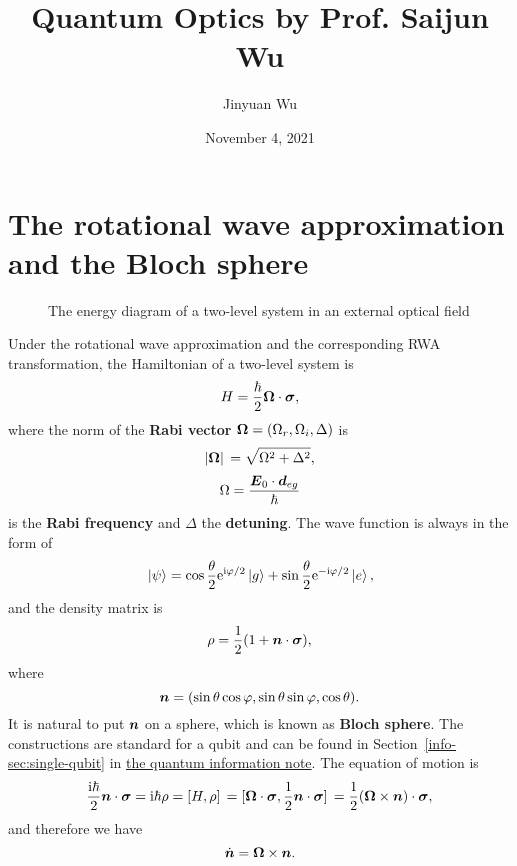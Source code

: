 \documentclass[hyperref, a4paper]{article}
\title{Quantum Optics by Prof. Saijun Wu}
\author{Jinyuan Wu}
\date{November 4, 2021}
\newcommand*{\ii}{\mathrm{i}}
\newcommand*{\ee}{\mathrm{e}}
\newcommand*{\concept}[1]{{\textbf{#1}}}
\newcommand{\infodoc}{\href{../information/quantum-circuit}{the quantum information note}}
\begin{document}
\maketitle

\section{The rotational wave approximation and the Bloch sphere}

\begin{figure}
    \centering
    
    \caption{The energy diagram of a two-level system in an external optical field}
\end{figure}

Under the rotational wave approximation and the corresponding RWA transformation, the Hamiltonian of a two-level system is 
\begin{equation}
    H = \frac{\hbar}{2} \vb*{\Omega} \cdot \vb*{\sigma},
    \label{eq:rwa-hamiltonian}
\end{equation}
where the norm of the \concept{Rabi vector} $\vb*{\Omega} = (\Omega_r, \Omega_i , \Delta)$ is
\begin{equation}
    \abs*{\vb*{\Omega}} = \sqrt{\Omega^2 + \Delta^2},
\end{equation}
\begin{equation}
    \Omega = \frac{\vb*{E}_0 \cdot \vb*{d}_{eg}}{\hbar}
    \label{eq:rabi-freq}
\end{equation}
is the \concept{Rabi frequency} and $\Delta$ the \concept{detuning}.
The wave function is always in the form of 
\begin{equation}
    \ket*{\psi} = \cos \frac{\theta}{2} \ee^{\ii \varphi /2 } \ket*{g} + \sin \frac{\theta}{2} \ee^{- \ii \varphi / 2} \ket*{e}, 
\end{equation}
and the density matrix is 
\begin{equation}
    \rho = \frac{1}{2} (1 + \vb*{n} \cdot \vb*{\sigma}),
\end{equation}
where 
\begin{equation}
    \vb*{n} = (\sin \theta \cos \varphi, \sin \theta \sin \varphi, \cos \theta).
\end{equation}
It is natural to put $\vb*{n}$ on a sphere, which is known as \concept{Bloch sphere}.
The constructions are standard for a qubit and can be found in Section~\ref{info-sec:single-qubit} in \infodoc.
The equation of motion is 
\[
    \frac{\ii \hbar}{2} \vb*{n} \cdot \vb*{\sigma} = \ii \hbar \rho = \comm*{H}{\rho} = \comm*{\vb*{\Omega} \cdot \vb*{\sigma}}{\frac{1}{2} \vb*{n} \cdot \vb*{\sigma}} = \frac{1}{2} (\vb*{\Omega} \times \vb*{n}) \cdot \vb*{\sigma},
\]
and therefore we have 
\begin{equation}
    \dot{\vb*{n}} = \vb*{\Omega} \times \vb*{n}. 
    \label{eq:n-eom}
\end{equation}
\end{document}
